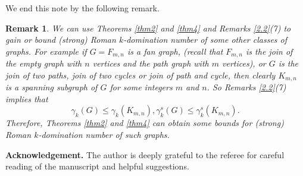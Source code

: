\documentclass[12pt]{amsart}
\newtheorem{remark}[theorem]{Remark}
\begin{document}
We end this note by the following remark.
\begin{remark}
We can use Theorems \ref{thm2} and \ref{thm4} and Remarks \ref{2.2}(7) to gain or bound (strong) Roman $k$-domination number of some other classes of graphs. For example if $G=F_{m,n}$ is a fan graph, (recall that $F_{m,n}$ is the join of the empty graph with $n$ vertices and the path graph with $m$ vertices), or $G$ is the join of two paths, join of two cycles or join of path and cycle, then clearly $K_{m,n}$ is a spanning subgraph of $G$ for some integers $m$ and $n$. So Remarks \ref{2.2}(7) implies that
$$\gamma_k(G)\leq \gamma_k(K_{m,n}), \gamma_k^s(G)\leq \gamma_k^s(K_{m,n}).$$
Therefore, Theorems \ref{thm2} and \ref{thm4} can obtain some bounds for (strong) Roman $k$-domination number of such graphs.
\end{remark}

\textbf{Acknowledgement.} The author is deeply grateful to the
referee for careful reading of the manuscript and helpful
suggestions.
\end{document}
